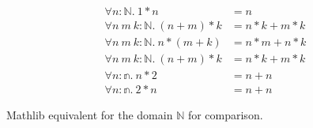 \begin{conjectureset}[H]
\begin{align}
\forall n : \mathbb{N}.\ 1 * n &= n \label{overlaprecursive:false_negative9}\\
\forall n\ m\ k : \mathbb{N}.\ (n + m) * k &= n * k + m * k \label{overlaprecursive:false_negative10}\\
\forall n\ m\ k : \mathbb{N}.\ n * (m + k) &= n * m + n * k \label{overlaprecursive:false_negative11}\\
\forall n\ m\ k : \mathbb{N}.\ (n + m) * k &= n * k + m * k \label{overlaprecursive:false_negative12}\\
\forall n : \mathbb{n}.\ n * 2 &= n + n \label{overlaprecursive:false_negative13}\\
\forall n : \mathbb{n}.\ 2 * n &= n + n \label{overlaprecursive:false_negative14}
\end{align}
\vspace{-0.9cm}
\caption{Mathlib equivalent for the domain $\mathbb{N}$ for comparison.}\label{eqs:mathlib_recursive:compare}
\end{conjectureset}
